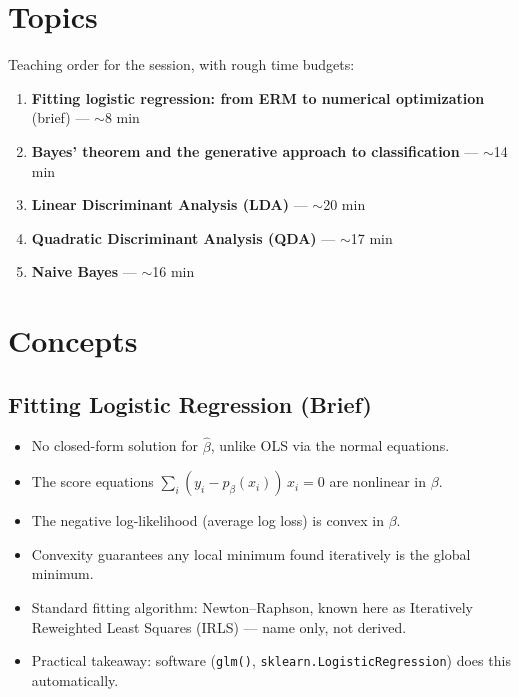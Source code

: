 \documentclass[11pt]{article}
\begin{document}
\section{Topics}
\label{sec:topics}
Teaching order for the session, with rough time budgets:

\begin{enumerate}
\item \textbf{Fitting logistic regression: from ERM to numerical optimization} (brief) --- $\sim$8 min
\item \textbf{Bayes' theorem and the generative approach to classification} --- $\sim$14 min
\item \textbf{Linear Discriminant Analysis (LDA)} --- $\sim$20 min
\item \textbf{Quadratic Discriminant Analysis (QDA)} --- $\sim$17 min
\item \textbf{Naive Bayes} --- $\sim$16 min
\end{enumerate}

\section{Concepts}

\subsection{Fitting Logistic Regression (Brief)}
\begin{itemize}
\item No closed-form solution for $\hat\beta$, unlike OLS via the normal equations.
\item The score equations $\sum_i (y_i - p_\beta(x_i))\,x_i = 0$ are nonlinear in $\beta$.
\item The negative log-likelihood (average log loss) is convex in $\beta$.
\item Convexity guarantees any local minimum found iteratively is the global minimum.
\item Standard fitting algorithm: Newton--Raphson, known here as Iteratively Reweighted Least Squares (IRLS) --- name only, not derived.
\item Practical takeaway: software (\texttt{glm()}, \texttt{sklearn.LogisticRegression}) does this automatically.
\end{itemize}
\end{document}
